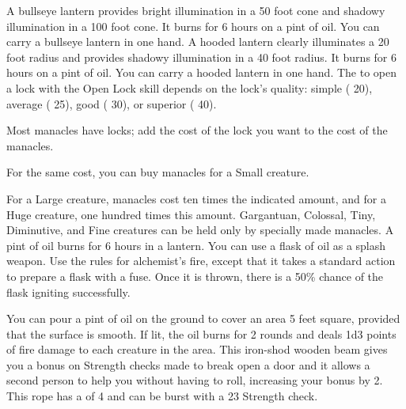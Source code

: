          A bullseye lantern provides bright illumination in a 50 foot cone and shadowy illumination in a 100 foot cone. It burns for 6 hours on a pint of oil. You can carry a bullseye lantern in one hand.
         A hooded lantern clearly illuminates a 20 foot radius and provides shadowy illumination in a 40 foot radius. It burns for 6 hours on a pint of oil. You can carry a hooded lantern in one hand.
         The  to open a lock with the Open Lock skill depends on the lock's quality: simple ( 20), average ( 25), good ( 30), or superior ( 40).
        \par Most manacles have locks; add the cost of the lock you want to the cost of the manacles.
        \par For the same cost, you can buy manacles for a Small creature.
        \par For a Large creature, manacles cost ten times the indicated amount, and for a Huge creature, one hundred times this amount. Gargantuan, Colossal, Tiny, Diminutive, and Fine creatures can be held only by specially made manacles.
         A pint of oil burns for 6 hours in a lantern. You can use a flask of oil as a splash weapon. Use the rules for alchemist's fire, except that it takes a standard action to prepare a flask with a fuse. Once it is thrown, there is a 50\% chance of the flask igniting successfully.
        \par You can pour a pint of oil on the ground to cover an area 5 feet square, provided that the surface is smooth. If lit, the oil burns for 2 rounds and deals 1d3 points of fire damage to each creature in the area.
         This iron-shod wooden beam gives you a  bonus on Strength checks made to break open a door and it allows a second person to help you without having to roll, increasing your bonus by 2.
         This rope has a  of 4 and can be burst with a  23 Strength check.
